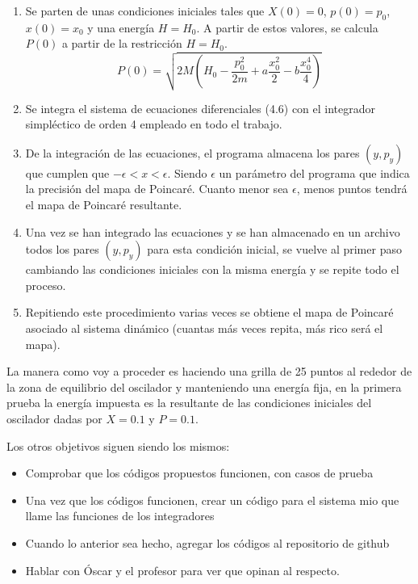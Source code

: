 \documentclass[idxtotoc,hyperref,openany]{labbook} %
\begin{document}
\begin{enumerate}
\item Se parten de unas condiciones iniciales tales que $X(0) = 0$, $p(0) = p_0$, $x(0) = x_{0}$ y una energía $H = H_0$. A partir de estos valores, se calcula $P(0)$ a partir de la restricción $H = H_0$.
\begin{equation}
P(0)=\sqrt{2M ( H_0-\frac {p_{0}^2}{2m}+a\frac {x_{0}^2}{2}-b\frac {x_{0}^4}{4})}
\end{equation}
\item Se integra el sistema de ecuaciones diferenciales (4.6) con el integrador simpléctico de orden 4 empleado en todo el trabajo.

\item De la integración de las ecuaciones, el programa almacena los pares $(y,p_y)$ que cumplen que $−\epsilon < x < \epsilon$. Siendo $\epsilon$ un parámetro del programa que indica la precisión del mapa de Poincaré. Cuanto menor sea $\epsilon$, menos puntos tendrá el mapa de Poincaré resultante.

\item Una vez se han integrado las ecuaciones y se han almacenado en un archivo todos los pares $(y,p_y)$ para esta condición inicial, se vuelve al primer paso cambiando las condiciones iniciales con la misma energía y se repite todo el proceso.

\item Repitiendo este procedimiento varias veces se obtiene el mapa de Poincaré asociado al sistema dinámico (cuantas más veces repita, más rico será el mapa).

\end{enumerate}
 
 La manera como voy a proceder es haciendo una grilla de 25 puntos al rededor de la zona de equilibrio del oscilador y manteniendo una energía fija, en la primera prueba la energía impuesta es la resultante de las condiciones iniciales del oscilador dadas por $X=0.1$ y $P=0.1$.
 




Los otros objetivos siguen siendo los mismos:
\begin{itemize}
\item Comprobar que los códigos propuestos funcionen, con casos de prueba
\item Una vez que los códigos funcionen, crear un código para el sistema mio que llame las funciones de los integradores
\item Cuando lo anterior sea hecho, agregar los códigos al repositorio de github
\item Hablar con Óscar y el profesor para ver que opinan al respecto.
\end{itemize}
\end{document}
